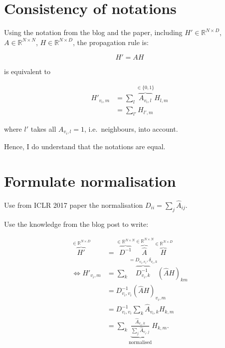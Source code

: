 
\section{Consistency of notations}%
\label{sec:consistency}

Using the notation from the blog and the paper, including $H'\in\mathbb{R}^{N\times D}$, $A\in\mathbb{R}^{N\times N}$, $H\in\mathbb{R}^{N\times D}$, the propagation rule is:

\begin{equation}
	H' = A H
\end{equation}

is equivalent to

\begin{equation}
	\begin{split}
		H'_{v_i, m} & = \sum_l \overbrace{A_{v_i, l}}^{\in \{0, 1\}} H_{l, m} \\
		            & = \sum_{l'} H_{l',m}
	\end{split}
\end{equation}

where $l'$ takes all $A_{v_i,l}=1$, i.e.\ neighbours, into account.

Hence, I do understand that the notations are equal.

\section{Formulate normalisation}

Use from ICLR 2017 paper the normalisation $D_{ii} = \sum_j \hat{A}_{ij}$.

Use the knowledge from the blog post to write:

\begin{equation}
	\begin{split}
		\overbrace{H'}^{\in \mathbb{R}^{N\times D}} & = \overbrace{D^{-1}}^{\in\mathbb{R}^{N\times N}} \overbrace{\hat{A}}^{\in \mathbb{R}^{N\times N}} \overbrace{H}^{\in\mathbb{R}^{N\times D}} \\
		\Leftrightarrow H'_{v_i, m} & = \sum_k \overbrace{D^{-1}_{v_i,k}}^{=D_{v_i,v_i}, \delta_{v_i, k}} {(\hat{A} H)}_{km} \\
			& = D^{-1}_{v_i, v_i} (\hat{A} H)_{v_i, m} \\
			& = D^{-1}_{{v}_i, v_i} \sum_k \hat{A}_{v_i, k} H_{k, m} \\
			& = \sum_k \underbrace{\frac{\hat{A}_{v_i, k}}{\sum_j \hat{A}_{v_i, j}}}_{\text{normalised}} H_{k, m}.
	\end{split}
\end{equation}

